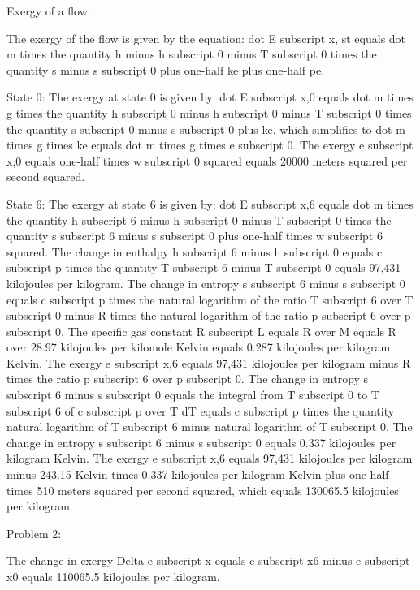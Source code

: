 Exergy of a flow:

The exergy of the flow is given by the equation:
dot E subscript x, st equals dot m times the quantity h minus h subscript 0 minus T subscript 0 times the quantity s minus s subscript 0 plus one-half ke plus one-half pe.

State 0:
The exergy at state 0 is given by:
dot E subscript x,0 equals dot m times g times the quantity h subscript 0 minus h subscript 0 minus T subscript 0 times the quantity s subscript 0 minus s subscript 0 plus ke,
which simplifies to dot m times g times ke equals dot m times g times e subscript 0.
The exergy e subscript x,0 equals one-half times w subscript 0 squared equals 20000 meters squared per second squared.

State 6:
The exergy at state 6 is given by:
dot E subscript x,6 equals dot m times the quantity h subscript 6 minus h subscript 0 minus T subscript 0 times the quantity s subscript 6 minus s subscript 0 plus one-half times w subscript 6 squared.
The change in enthalpy h subscript 6 minus h subscript 0 equals c subscript p times the quantity T subscript 6 minus T subscript 0 equals 97,431 kilojoules per kilogram.
The change in entropy s subscript 6 minus s subscript 0 equals c subscript p times the natural logarithm of the ratio T subscript 6 over T subscript 0 minus R times the natural logarithm of the ratio p subscript 6 over p subscript 0.
The specific gas constant R subscript L equals R over M equals R over 28.97 kilojoules per kilomole Kelvin equals 0.287 kilojoules per kilogram Kelvin.
The exergy e subscript x,6 equals 97,431 kilojoules per kilogram minus R times the ratio p subscript 6 over p subscript 0.
The change in entropy s subscript 6 minus s subscript 0 equals the integral from T subscript 0 to T subscript 6 of c subscript p over T dT equals c subscript p times the quantity natural logarithm of T subscript 6 minus natural logarithm of T subscript 0.
The change in entropy s subscript 6 minus s subscript 0 equals 0.337 kilojoules per kilogram Kelvin.
The exergy e subscript x,6 equals 97,431 kilojoules per kilogram minus 243.15 Kelvin times 0.337 kilojoules per kilogram Kelvin plus one-half times 510 meters squared per second squared,
which equals 130065.5 kilojoules per kilogram.

Problem 2:

The change in exergy Delta e subscript x equals e subscript x6 minus e subscript x0 equals 110065.5 kilojoules per kilogram.